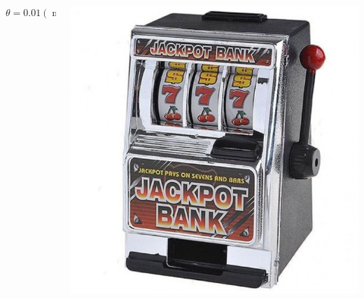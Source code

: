 \documentclass[fullscreen=true, bookmarks=true, hyperref={pdfencoding=unicode}]{beamer}
\begin{document}
\begin{frame}
\begin{columns}
\begin{column}{.25\paperwidth}
\begin{center}
          $\theta = 0.01 (\min)$
        \end{center}
      \end{column}
      \begin{column}{.25\paperwidth}
        \begin{center}
          \includegraphics[keepaspectratio,
                           width=.2\paperwidth]{data-kopilkabandit.jpg}


\end{center}
\end{column}
\end{columns}
\end{frame}
\end{document}
